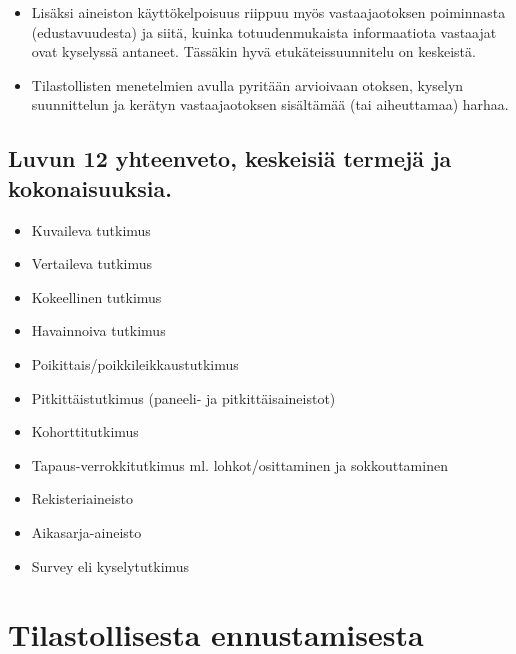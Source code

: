 \documentclass[
]{book}
\providecommand{\tightlist}{%
  \setlength{\itemsep}{0pt}\setlength{\parskip}{0pt}}
\begin{document}
\begin{itemize}
  \begin{itemize}
  \tightlist
  \item
    Lisäksi aineiston käyttökelpoisuus riippuu myös vastaajaotoksen poiminnasta (edustavuudesta) ja siitä, kuinka totuudenmukaista informaatiota vastaajat ovat kyselyssä antaneet. Tässäkin hyvä etukäteissuunnitelu on keskeistä.
  \item
    Tilastollisten menetelmien avulla pyritään arvioivaan otoksen, kyselyn suunnittelun ja kerätyn vastaajaotoksen sisältämää (tai aiheuttamaa) harhaa.
  \end{itemize}
\end{itemize}

\hypertarget{luvun-12-yhteenveto-keskeisiuxe4-termejuxe4-ja-kokonaisuuksia.}{%
\section{Luvun 12 yhteenveto, keskeisiä termejä ja kokonaisuuksia.}\label{luvun-12-yhteenveto-keskeisiuxe4-termejuxe4-ja-kokonaisuuksia.}}

\begin{itemize}
\tightlist
\item
  Kuvaileva tutkimus
\item
  Vertaileva tutkimus
\item
  Kokeellinen tutkimus
\item
  Havainnoiva tutkimus
\item
  Poikittais/poikkileikkaustutkimus
\item
  Pitkittäistutkimus (paneeli- ja pitkittäisaineistot)
\item
  Kohorttitutkimus
\item
  Tapaus-verrokkitutkimus ml. lohkot/osittaminen ja sokkouttaminen
\item
  Rekisteriaineisto
\item
  Aikasarja-aineisto
\item
  Survey eli kyselytutkimus
\end{itemize}

\hypertarget{luku13}{%
\chapter{Tilastollisesta ennustamisesta}\label{luku13}}
\end{document}
